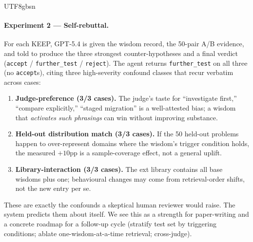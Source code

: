\documentclass{article}
\begin{document}
\begin{CJK*}{UTF8}{gbsn}
\paragraph{Experiment 2 — Self-rebuttal.} For each KEEP, GPT-5.4 is
given the wisdom record, the 50-pair A/B evidence, and told to
produce the three strongest counter-hypotheses and a final verdict
(\texttt{accept} / \texttt{further\_test} / \texttt{reject}). The
agent returns \texttt{further\_test} on all three (no
\texttt{accept}s), citing three high-severity confound classes that
recur verbatim across cases:
\begin{enumerate}[leftmargin=*, topsep=2pt, itemsep=2pt]
  \item \textbf{Judge-preference (3/3 cases).} The judge's taste for
    ``investigate first,'' ``compare explicitly,'' ``staged
    migration'' is a well-attested bias; a wisdom that \emph{activates
    such phrasings} can win without improving substance.
  \item \textbf{Held-out distribution match (3/3 cases).} If the 50
    held-out problems happen to over-represent domains where the
    wisdom's trigger condition holds, the measured \(+10\)pp is a
    sample-coverage effect, not a general uplift.
  \item \textbf{Library-interaction (3/3 cases).} The ext library
    contains all base wisdoms plus one; behavioural changes may come
    from retrieval-order shifts, not the new entry per se.
\end{enumerate}
These are exactly the confounds a skeptical human reviewer would
raise. The system predicts them about itself. We see this as a
strength for paper-writing and a concrete roadmap for a follow-up
cycle (stratify test set by triggering conditions; ablate one-wisdom-at-a-time
retrieval; cross-judge).


\end{CJK*}
\end{document}
